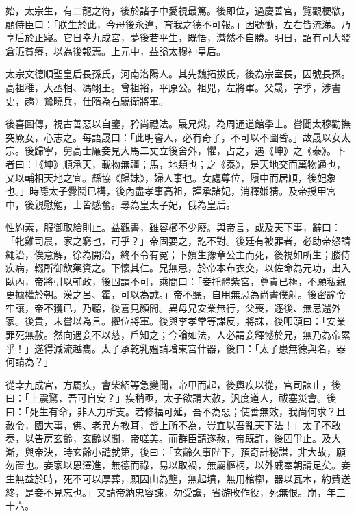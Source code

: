 \begin{pinyinscope}
 始，太宗生，有二龍之符，後於諸子中愛視最篤。後即位，過慶善宮，覽觀梗欷，顧侍臣曰：「朕生於此，今母後永違，育我之德不可報。」因號慟，左右皆流涕。乃享后於正寢。它日幸九成宮，夢後若平生，既悟，潸然不自勝。明日，詔有司大發倉賑貧瘠，以為後報焉。上元中，益謚太穆神皇后。



 太宗文德順聖皇后長孫氏，河南洛陽人。其先魏拓拔氏，後為宗室長，因號長孫。高祖稚，大丞相、馮翊王。曾祖裕，平原公。祖兕，左將軍。父晟，字季，涉書史，趫〗鷙曉兵，仕隋為右驍衛將軍。



 後喜圖傳，視古善惡以自鑒，矜尚禮法。晟兄熾，為周通道館學士。嘗聞太穆勸撫突厥女，心志之。每語晟曰：「此明睿人，必有奇子，不可以不圖昏。」故晟以女太宗。後歸寧，舅高士廉妾見大馬二丈立後舍外，懼，占之，遇《坤》之《泰》。卜者曰：「《坤》順承天，載物無疆；馬，地類也；之《泰》，是天地交而萬物通也，又以輔相天地之宜。繇協《歸妹》，婦人事也。女處尊位，履中而居順，後妃象也。」時隱太子釁鬩已構，後內盡孝事高祖，謹承諸妃，消釋嫌猜。及帝授甲宮中，後親慰勉，士皆感奮。尋為皇太子妃，俄為皇后。



 性約素，服御取給則止。益觀書，雖容櫛不少廢。與帝言，或及天下事，辭曰：「牝雞司晨，家之窮也，可乎？」帝固要之，訖不對。後廷有被罪者，必助帝怒請繩治，俟意解，徐為開治，終不令有冤；下嬪生豫章公主而死，後視如所生；媵侍疾病，輟所御飲藥資之。下懷其仁。兄無忌，於帝本布衣交，以佐命為元功，出入臥內，帝將引以輔政，後固謂不可，乘間曰：「妾托體紫宮，尊貴已極，不願私親更據權於朝。漢之呂、霍，可以為誡。」帝不聽，自用無忌為尚書僕射。後密諭令牢讓，帝不獲已，乃聽，後喜見顏間。異母兄安業無行，父喪，逐後、無忌還外家。後貴，未嘗以為言。擢位將軍。後與李孝常等謀反，將誅，後叩頭曰：「安業罪死無赦。然向遇妾不以慈，戶知之；今論如法，人必謂妾釋憾於兄，無乃為帝累乎！」遂得減流越巂。太子承乾乳媼請增東宮什器，後曰：「太子患無德與名，器何請為？」



 從幸九成宮，方屬疾，會柴紹等急變聞，帝甲而起，後輿疾以從，宮司諫止，後曰：「上震驚，吾可自安？」疾稍亟，太子欲請大赦，汎度道人，祓塞災會。後曰：「死生有命，非人力所支。若修福可延，吾不為惡；使善無效，我尚何求？且赦令，國大事，佛、老異方教耳，皆上所不為，豈宜以吾亂天下法！」太子不敢奏，以告房玄齡，玄齡以聞，帝嗟美。而群臣請遂赦，帝既許，後固爭止。及大漸，與帝決，時玄齡小譴就第，後曰：「玄齡久事陛下，預奇計秘謀，非大故，願勿置也。妾家以恩澤進，無德而祿，易以取禍，無屬樞柄，以外戚奉朝請足矣。妾生無益於時，死不可以厚葬，願因山為壟，無起墳，無用棺槨，器以瓦木，約費送終，是妾不見忘也。」又請帝納忠容諫，勿受讒，省游畋作役，死無恨。崩，年三十六。




\end{pinyinscope}
